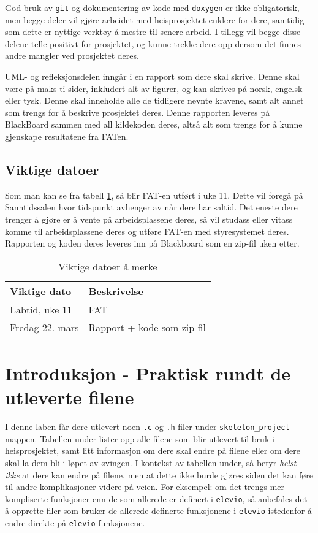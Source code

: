 \begin{alphasection}
God bruk av \verb|git| og dokumentering av kode med \verb|doxygen| er ikke obligatorisk, men begge deler vil gjøre arbeidet med heisprosjektet enklere for dere, samtidig som dette er nyttige verktøy å mestre til senere arbeid. I tillegg vil begge disse delene telle positivt for prosjektet, og kunne trekke dere opp dersom det finnes andre mangler ved prosjektet deres.

UML- og refleksjonsdelen inngår i en rapport som dere skal skrive. Denne skal være på maks ti sider, inkludert alt av figurer, og kan skrives på norsk, engelsk eller tysk. Denne skal inneholde alle de tidligere nevnte kravene, samt alt annet som trengs for å beskrive prosjektet deres. Denne rapporten leveres på BlackBoard sammen med all kildekoden deres, altså alt som trengs for å kunne gjenskape resultatene fra FATen.

\subsection*{Viktige datoer}
Som man kan se fra tabell \ref{tab:viktige-dato}, så blir FAT-en utført i uke 11. Dette vil foregå på Sanntidssalen hvor tidspunkt avhenger av når dere har saltid. Det eneste dere trenger å gjøre er å vente på arbeidsplassene deres, så vil studass eller vitass komme til arbeidsplassene deres og utføre FAT-en med styresystemet deres. Rapporten og koden deres leveres inn på Blackboard som en zip-fil uken etter.

\begin{table}[ht]
\centering
 \begin{tabular}{|p{4cm} p{5.5cm}|} 
 \hline
 Viktige dato & Beskrivelse \\ [0.5ex] 
 \hline\hline
  Labtid, uke 11 & FAT \\
 \hline
  Fredag 22. mars & Rapport + kode som zip-fil \\
 \hline
\end{tabular}
\caption{Viktige datoer å merke}
\label{tab:viktige-dato} 
\end{table}

\section{Introduksjon - Praktisk rundt de utleverte filene}

I denne laben får dere utlevert noen \verb|.c| og \verb|.h|-filer under \verb|skeleton_project|-mappen. Tabellen under lister opp alle filene som blir utlevert til bruk i heisprosjektet, samt litt informasjon om dere skal endre på filene eller om dere skal la dem bli i løpet av øvingen. I kontekst av tabellen under, så betyr \textit{helst ikke} at dere kan endre på filene, men at dette ikke burde gjøres siden det kan føre til andre komplikasjoner videre på veien. For eksempel: om det trengs mer kompliserte funksjoner enn de som allerede er definert i \verb|elevio|, så anbefales det å opprette filer som bruker de allerede definerte funksjonene i \verb|elevio| istedenfor å endre direkte på \verb|elevio|-funksjonene.


\end{alphasection}
